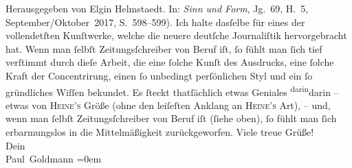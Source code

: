 \begin{ledgroupsized}[t]{13cm}
{{{                     Herausgegeben von Elgin Helmstaedt. In: \emph{Sinn und Form},
                     Jg. 69, H. 5, September/Oktober 2017, S. 598–599)}}}\label{K_L02899-1h}.
               Ich halte dasſelbe für eines der vollendetſten Kunſtwerke, welche die neuere deutſche Journaliſtik
               hervorgebracht hat. Wenn man ſelbſt Zeitungsſchreiber von Beruf iſt, ſo fühlt man
               ſich tief verſtimmt durch  dieſe Arbeit, die eine ſolche Kunſt
               des Ausdrucks, eine ſolche Kraft der Concentrirung, einen ſo unbedingt perſönlichen
               Styl und ein ſo gründliches Wiſſen bekundet. Es ſteckt thatſächlich etwas Geniales \substVorne{}\textsuperscript{darin}\substDazwischen{}darin\substHinten{} – {\pb}etwas von \textsc{Heine’s} Größe (ohne den leiſeſten
               Anklang an \textsc{Heine’s} Art), – und, wenn man ſelbſt
               Zeitungsſchreiber von Beruf iſt (ſiehe oben), ſo fühlt man ſich erbarmungslos in die
               Mittelmäßigkeit zurückgeworfen.\pend
           \pstart
           Viele treue Grüße! {\\[\baselineskip]}Dein {\\[\baselineskip]}\spacefill\mbox{Paul Goldmann}\pend
           \leftskip=0em{}
         
         \endnumbering{}\end{ledgroupsized}  \newcommand{\dateiname}{L02899}\newcommand{\titel}{Paul Goldmann an Arthur Schnitzler, 13. 12. [1899]}\newcommand{\editorInnen}{Martin Anton Müller und Laura Untner}
      
